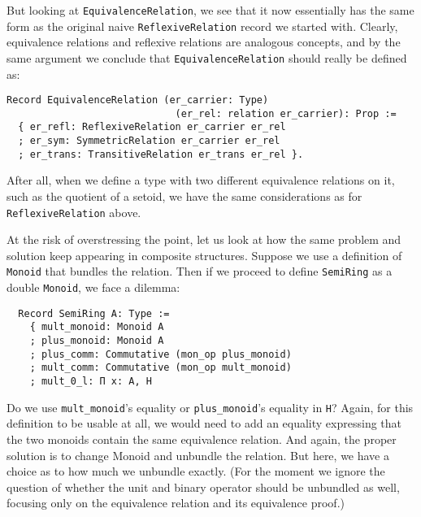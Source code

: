 \documentclass[a4paper,10pt,runningheads]{llncs}
\begin{document}
But looking at \lstinline|EquivalenceRelation|, we see that it now essentially has the same form as the
original naive \lstinline|ReflexiveRelation| record we started with. Clearly, equivalence relations
and reflexive relations are analogous concepts, and by the same argument we
conclude that \lstinline|EquivalenceRelation| should really be defined as:

\begin{lstlisting}
Record EquivalenceRelation (er_carrier: Type)
                             (er_rel: relation er_carrier): Prop :=
  { er_refl: ReflexiveRelation er_carrier er_rel
  ; er_sym: SymmetricRelation er_carrier er_rel
  ; er_trans: TransitiveRelation er_trans er_rel }.
\end{lstlisting}


After all, when we define a type with
two different equivalence relations on it,
such as the quotient of a setoid,
we have the same considerations as for \lstinline|ReflexiveRelation| above.

At the risk of overstressing the point, let us look at how the same problem and solution keep
appearing in composite structures. Suppose we use a definition of \lstinline|Monoid| that bundles the
relation. Then if we proceed to define \lstinline|SemiRing| as a double \lstinline|Monoid|, we face a dilemma:
\begin{lstlisting}
  Record SemiRing A: Type :=
    { mult_monoid: Monoid A 
    ; plus_monoid: Monoid A 
    ; plus_comm: Commutative (mon_op plus_monoid)
    ; mult_comm: Commutative (mon_op mult_monoid)
    ; mult_0_l: Π x: A, H
\end{lstlisting}

Do we use \lstinline|mult_monoid|'s equality or \lstinline|plus_monoid|'s equality in \lstinline|H|?
Again, for this definition to be usable at all, we would need to add an equality expressing that the
two monoids contain the same equivalence relation. And again, the proper solution is to change
Monoid and unbundle the relation. But here, we have a choice as to how much we unbundle exactly.
(For the moment we ignore the question of whether the unit and binary operator should be unbundled
as well, focusing only on the equivalence relation and its equivalence proof.)


\end{document}
